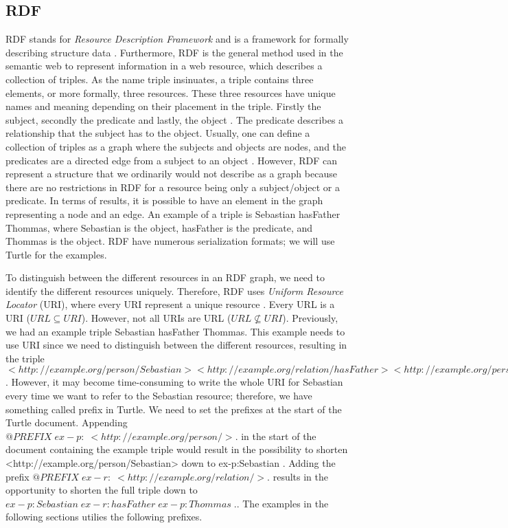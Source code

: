 \subsection{RDF}
\label{RDF}
RDF stands for \emph{Resource Description Framework} and is a framework for formally describing structure data \autocite[19]{FOSWT}. Furthermore, RDF is the general method used in the semantic web to represent information in a web resource, which describes a collection of triples. As the name triple insinuates, a triple contains three elements, or more formally, three resources. These three resources have unique names and meaning depending on their placement in the triple. Firstly the subject, secondly the predicate and lastly, the object \autocite{W3C_RDF}. The predicate describes a relationship that the subject has to the object. Usually, one can define a collection of triples as a graph where the subjects and objects are nodes, and the predicates are a directed edge from a subject to an object \autocite{W3C_RDF}. However, RDF can represent a structure that we ordinarily would not describe as a graph because there are no restrictions in RDF for a resource being only a subject/object or a predicate. In terms of results, it is possible to have an element in the graph representing a node and an edge. An example of a triple is Sebastian hasFather Thommas, where Sebastian is the object, hasFather is the predicate, and Thommas is the object. RDF have numerous serialization formats; we will use Turtle for the examples.  

\para
To distinguish between the different resources in an RDF graph, we need to identify the different resources uniquely. Therefore, RDF uses \emph{Uniform Resource Locator} (URI), where every URI represent a unique resource \autocite[21-22]{FOSWT}. Every URL is a URI ($URL\subseteq URI$). However, not all URIs are URL ($URL\nsubseteq URI$).  Previously, we had an example triple Sebastian hasFather Thommas. This example needs to use URI since we need to distinguish between the different resources, resulting in the triple $<http://example.org/person/Sebastian> <http://example.org/relation/hasFather> <http://example.org/person/Thommas> .$ . However, it may become time-consuming to write the whole URI for Sebastian every time we want to refer to the Sebastian resource; therefore, we have something called prefix in Turtle. We need to set the prefixes at the start of the Turtle document. Appending $@PREFIX\; ex-p:\; <http://example.org/person/>.$ in the start of the document containing the example triple would result in the possibility to shorten <http://example.org/person/Sebastian> down to ex-p:Sebastian . Adding the prefix $@PREFIX\; ex-r:\; <http://example.org/relation/>.$ results in the opportunity to shorten the full triple down to $ex-p:Sebastian\; ex-r:hasFather\; ex-p:Thommas\; .$. The examples in the following sections utilies the following prefixes.

